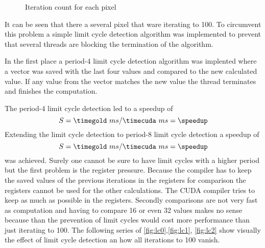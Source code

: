 \begin{figure}[ht] \centering
\caption{Iteration count for each pixel}
\label{fig:lc}%
\end{figure}

It can be seen that there a several pixel that ware iterating to 100. To circumvent
this problem a simple limit cycle detection algorithm was implemented to prevent
that several threads are blocking the termination of the algorithm. 

In the first place a period-4 limit cycle detection algorithm was implented where
a vector was saved with the last four values and compared to the new calculated 
value. If any value from the vector matches the new value the thread terminates
and finishes the computation. 

The period-4 limit cycle detection led to a speedup of 
\fpDiv{\speedup}{\timegold}{\timecuda}
\begin{equation*}\label{eq:speedup9}
	S = \timegold\ ms/\timecuda\ ms = \speedup
\end{equation*}
Extending the limit cycle detection to period-8 limit cycle detection a speedup
of 
\fpDiv{\speedup}{\timegold}{\timecuda}
\begin{equation*}\label{eq:speedup10}
	S = \timegold\ ms/\timecuda\ ms = \speedup
\end{equation*}
was achieved. Surely one cannot be sure to have limit cycles with a higher
period but the first problem is the register pressure. Because the compiler has
to keep the saved values of the previous iterations in the registers for
comparison the registers cannot be used for the other calculations. The
\gls{CUDA} compiler tries to keep as much as possible in the registers. Secondly
comparisons are not very fast as computation and having to compare 16 or even 32
values makes no sense because than the prevention of limit cycles would cost
more performance than just iterating to 100. The following series of
\autoref{fig:lc0},\autoref{fig:lc1}, \autoref{fig:lc2} show visually the effect
of limit cycle detection an how all iterations to 100 vanish.

